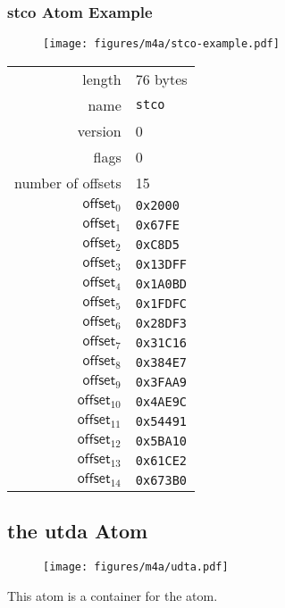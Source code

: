 \subsubsection{stco Atom Example}
\begin{figure}[h]
  \texttt{[image: figures/m4a/stco-example.pdf]}
\end{figure}
\par
\noindent
{
\begin{tabular}{rl}
  \textsf{length} & 76 bytes \\
  \textsf{name} & \texttt{stco} \\
  \textsf{version} & 0 \\
  \textsf{flags} & 0 \\
  \textsf{number of offsets} & 15 \\
  $\textsf{offset}_{0}$ & \texttt{0x2000} \\
  $\textsf{offset}_{1}$ & \texttt{0x67FE} \\
  $\textsf{offset}_{2}$ & \texttt{0xC8D5} \\
  $\textsf{offset}_{3}$ & \texttt{0x13DFF} \\
  $\textsf{offset}_{4}$ & \texttt{0x1A0BD} \\
  $\textsf{offset}_{5}$ & \texttt{0x1FDFC} \\
  $\textsf{offset}_{6}$ & \texttt{0x28DF3} \\
  $\textsf{offset}_{7}$ & \texttt{0x31C16} \\
  $\textsf{offset}_{8}$ & \texttt{0x384E7} \\
  $\textsf{offset}_{9}$ & \texttt{0x3FAA9} \\
  $\textsf{offset}_{10}$ & \texttt{0x4AE9C} \\
  $\textsf{offset}_{11}$ & \texttt{0x54491} \\
  $\textsf{offset}_{12}$ & \texttt{0x5BA10} \\
  $\textsf{offset}_{13}$ & \texttt{0x61CE2} \\
  $\textsf{offset}_{14}$ & \texttt{0x673B0} \\
\end{tabular}
}

\clearpage

\subsection{the utda Atom}
\begin{figure}[h]
  \texttt{[image: figures/m4a/udta.pdf]}
\end{figure}
\par
\noindent
This atom is a container for the  atom.

